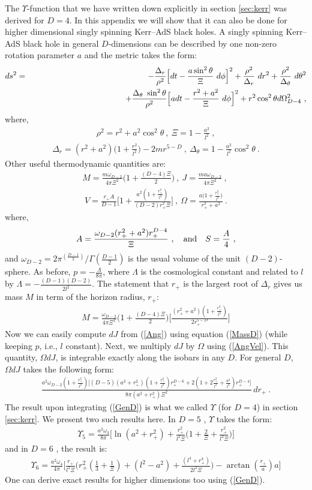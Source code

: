 \documentclass[letterpaper,11pt]{article}
\newcommand{\bea}{\begin{eqnarray}}
\newcommand{\eea}{\end{eqnarray}}
\begin{document}
The $\Upsilon$-function that we have written down explicitly in section \ref{sec:kerr} was derived for $D=4$. In this appendix we will show that it can also be done for higher dimensional singly spinning Kerr--AdS black holes. A singly spinning Kerr--AdS black hole in general $D$-dimensions can be described by one non-zero rotation parameter $a$ and the metric takes the form:
\bea
ds^2&=&-\frac{\Delta_{r}}{\rho ^2}\Big[dt-\frac{a \sin^2 \theta}{\Xi} \ d\phi \Big]^2+\frac{\rho ^2}{\Delta_{r}} \ dr^2+\frac{\rho ^2}{\Delta_{\theta}} \ d\theta ^2\nonumber \\
&&\hskip 4cm +\frac{\Delta_{\theta} \ \sin^{2}\theta}{\rho ^2} \Big[a dt-\frac{r^2+a^2}{\Xi} \ d\phi \Big]^2+r^2 \cos^2 \theta d\Omega^2_{D-4} \ ,
\eea
where,
\bea
\rho^2 =r^2+a^2 \cos^2\theta \ , \ \Xi =1-\frac{a^2}{l^2} \ ,
\eea
\bea \label{radialD}
\Delta_{r}=(r^2+a^2)\Big(1+\frac{r^2}{l^2}\Big)-2mr^{5-D} \ , \ \Delta_{\theta}=1-\frac{a^2}{l^2} \cos^2\theta \ .
\eea
Other useful thermodynamic quantities are:
\bea \label{Ang}
M=\frac{m\omega_{D-2}}{4 \pi \Xi ^2}\Big(1+\frac{(D-4)\Xi}{2}\Big) \ , \ 
J=\frac{m a \omega_{D-2}}{4 \pi \Xi ^2} \ , \ 
\eea
\bea \label{AngVel}
V=\frac{r_{+}A}{D-1}\Big[1+\frac{a^2 (1+\frac{r^2_{+}}{l^2})}{(D-2)r^2_{+}\Xi}\Big] \ , \ 
\Omega = \frac{a\Big(1+\frac{r^2_{+}}{l^2}\Big)}{r^2_{+}+a^2} \ .
\eea
where,
\bea
A=\frac{\omega_{D-2}(r^2_{+}+a^2)r^{D-4}_{+}}{\Xi} \ , \quad {\rm and} \quad S=\frac{A}{4} \ , 
\eea
and $\omega_{D-2}= 2 \pi ^{(\frac{D-1}{2})}/\Gamma(\frac{D-1}{2})$ is the usual volume of the unit $(D-2)$-sphere. 
As before, $p=-\frac{\Lambda}{8 \pi}$, where $\Lambda$ is the cosmological constant and related to $l$ by $\Lambda = -\frac{(D-1)(D-2)}{2 l^2}$.
The statement that $r_{+}$ is the largest root of $\Delta_r$ gives us mass $M$ in term of the horizon radius, $r_{+}$:
\bea \label{MassD}
M=\frac{\omega_{D-2}}{4 \pi \Xi ^2}\Big(1+\frac{(D-4)\Xi}{2}\Big)\Big[\frac{(r^2_{+}+a^2)(1+\frac{r^2_{+}}{l^2})}{2r^{5-D}_{+}}\Big]
\eea
Now we can easily compute $dJ$ from (\ref{Ang}) using equation (\ref{MassD}) (while keeping $p$, i.e., $l$ constant). Next, we multiply $dJ$ by $\Omega$ using (\ref{AngVel}). This quantity, $\Omega dJ$, is integrable exactly along the isobars in any $D$. For general $D$, $\Omega dJ$ takes the following form:
\bea \label{GenD}
\frac{a^2 \omega_{D-2}(1+\frac{r^2_{+}}{l^2})\Big[(D-5)(a^2+r^2_{+})(1+\frac{r^2_{+}}{l^2})r^{D-6}_{+} + 2(1+2\frac{r^2_{+}}{l^2}+\frac{a^2}{l^2})r^{D-4}_{+}\Big]}{8 \pi (a^2+r^2_{+})\Xi ^2} \, dr_+ \ .
\eea
The result upon integrating (\ref{GenD}) is what we called $\Upsilon$ (for $D=4$) in section \ref{sec:kerr}. We present two such results here. In $D=5$ , $\Upsilon$ takes the form:
\bea
\Upsilon_5 =\frac{a^2 \omega_3}{8 \pi}\Big[ \ln(a^2+r^2_{+})+\frac{r^2_{+}}{l^2 \Xi}\Big(1+\frac{2}{\Xi}+\frac{r^2_{+}}{l^2 \Xi}\Big)\Big]
\eea
and in $D=6$ , the result is:
\bea
\Upsilon_6 =\frac{a^2 \omega_4}{4 \pi}\Big[\frac{r_{+}}{l^2 \Xi}\Big(r^2_{+}(\frac{1}{3}+\frac{1}{\Xi})+(l^2-a^2)+\frac{(l^4+r^4_{+})}{2 l^2 \Xi}\Big)-\arctan(\frac{r_{+}}{a})a\Big]
\eea
One can derive exact results for higher dimensions too using (\ref{GenD}).
\end{document}

